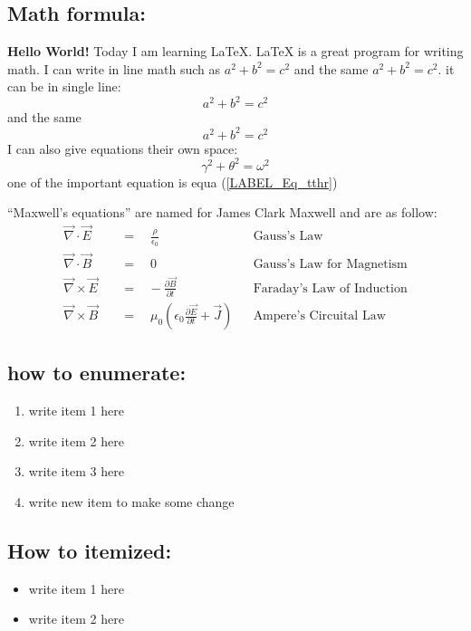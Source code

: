 \documentclass{article} %
\begin{document}
        \subsection{Math formula:}
        \textbf{Hello World!} Today I am learning \LaTeX. \LaTeX{} is a great program 
        for writing math. I can write in line math such as $a^2+b^2=c^2$ and the same \(a^2+b^2=c^2\). 
        it can be in single line: $$a^2+b^2=c^2$$  and the same \[a^2+b^2=c^2\]
        I can also give equations their own space: 
        \begin{equation} 
            \gamma^2+\theta^2=\omega^2
            \label{LABEL_Eq_tthr}
        \end{equation}
       one of the important equation is equa (\ref{LABEL_Eq_tthr})

        ``Maxwell's equations'' are named for James Clark Maxwell and are as follow:
        \begin{align}
            \vec{\nabla} \cdot \vec{E} \quad &=\quad\frac{\rho}{\epsilon_0} &&\text{Gauss's Law} \\
            \vec{\nabla} \cdot \vec{B} \quad &=\quad 0 &&\text{Gauss's Law for Magnetism}\\
            \vec{\nabla} \times \vec{E} \quad &=\hspace{10pt}-\frac{\partial{\vec{B}}}{\partial{t}} &&\text{Faraday's Law of Induction} \\ 
            \vec{\nabla} \times \vec{B} \quad &=\quad \mu_0\left( \epsilon_0\frac{\partial{\vec{E}}}{\partial{t}}+\vec{J}\right) &&\text{Ampere's Circuital Law}
        \end{align}

        \subsection{how to enumerate:} 
        \begin{enumerate} 
            \item write item 1 here
            \item write item 2 here 
            \item write item 3 here 
            \item write new item to make some change
        \end{enumerate}

        \subsection{How to itemized:}
        \begin{itemize}
            \item write item 1 here 
            \item write item 2 here 
        \end{itemize}
\end{document}
